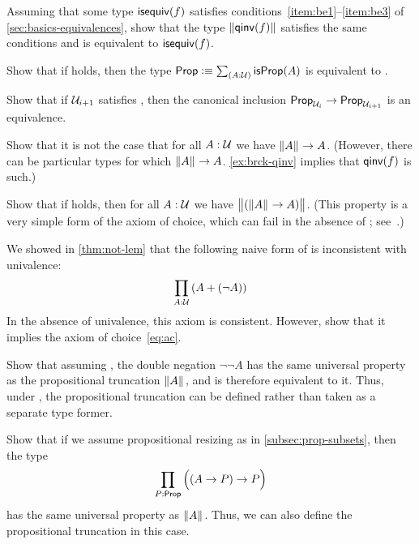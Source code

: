 \begin{ex}\label{ex:brck-qinv}
  Assuming that some type $\mathsf{isequiv}(f)$ satisfies conditions~\ref{item:be1}--\ref{item:be3} of \autoref{sec:basics-equivalences}, show that the type $\mathopen{}\left\Vert \mathsf{qinv}(f)\right\Vert_{}\mathclose{}$ satisfies the same conditions and is equivalent to $\mathsf{isequiv}(f)$.
\end{ex}

\begin{ex}
  Show that if \LEM{} holds, then the type $\prop \defeq \sm{A:\type} \isprop(A)$ is equivalent to \bool.
\end{ex}

\begin{ex}\label{ex:lem-impred}
  Show that if $\mathcal{U}_{i+1}$ satisfies \LEM{}, then the canonical inclusion $\mathsf{Prop}_{\mathcal{U}_i} \to \mathsf{Prop}_{\mathcal{U}_{i+1}}$ is an equivalence.
\end{ex}

\begin{ex}
  Show that it is not the case that for all $A:\mathcal{U}$ we have $\mathopen{}\left\Vert A\right\Vert_{}\mathclose{} \to A$.
  (However, there can be particular types for which $\mathopen{}\left\Vert A\right\Vert_{}\mathclose{}\to A$.
  \autoref{ex:brck-qinv} implies that $\mathsf{qinv}(f)$ is such.)
\end{ex}

\begin{ex}
  Show that if \LEM{} holds, then for all $A:\mathcal{U}$ we have $\bigl\Vert (\mathopen{}\left\Vert A\right\Vert_{}\mathclose{} \to A)\bigr\Vert_{}$.
  (This property is a very simple form of the axiom of choice, which can fail in the absence of \LEM{}; see~\cite{krausgeneralizations}.)
\end{ex}

\begin{ex}
  We showed in \autoref{thm:not-lem} that the following naive form of \LEM{} is inconsistent with univalence:
  \[ \prd{A:\type} (A+(\neg A)) \]
  In the absence of univalence, this axiom is consistent.
  However, show that it implies the axiom of choice~\eqref{eq:ac}.
\end{ex}

\begin{ex}\label{ex:lem-brck}
  Show that assuming \LEM{}, the double negation $\neg \neg A$ has the same universal property as the propositional truncation $\mathopen{}\left\Vert A\right\Vert_{}\mathclose{}$, and is therefore equivalent to it.
  Thus, under \LEM{}, the propositional truncation can be defined rather than taken as a separate type former.
\end{ex}

\begin{ex}\label{ex:impred-brck}
  Show that if we assume propositional resizing as in \autoref{subsec:prop-subsets}, then the type
  \[\prd{P:\prop} \Parens{(A\to P)\to P}\]
  has the same universal property as $\mathopen{}\left\Vert A\right\Vert_{}\mathclose{}$.
  Thus, we can also define the propositional truncation in this case.
\end{ex}

